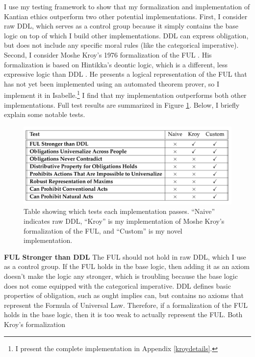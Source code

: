 \begin{isabellebody}
\begin{isamarkuptext}
I use my testing framework to show that my formalization and implementation of Kantian ethics outperform 
two other potential implementations. First, I consider raw DDL, which serves as a control group because it simply contains the base logic
on top of which I build other implementations. DDL can express obligation, but does not include any 
specific moral rules (like the categorical imperative). Second, I consider Moshe Kroy's 1976 formalization 
of the FUL \citep{kroy}. His formalization is based on Hintikka's deontic logic, which is a different,
less expressive logic than DDL \citep{hintikka}. He presents a logical representation of the FUL that has not yet been implemented
using an automated theorem prover, so I implement it in Isabelle.\footnote{I present the complete implementation in
Appendix \ref{kroydetails}.} I find that my implementation outperforms 
both other implementations. Full test results are summarized in Figure \ref{table}. Below, I briefly 
explain some notable tests.%
\end{isamarkuptext}\isamarkuptrue%
%
\begin{figure}
\centering
\includegraphics[scale=0.165]{goalstable.jpeg}
\caption{Table showing which tests each implementation passes. ``Naive'' indicates raw DDL, 
``Kroy'' is my implementation of Moshe Kroy's formalization of the FUL, and ``Custom'' is my novel implementation.} \label{table}
\end{figure}
%
\begin{isamarkuptext}%
\noindent \textbf{FUL Stronger than DDL} The FUL should not hold in raw DDL, which I use as a control group. 
If the FUL holds in the base logic, then adding it as an axiom doesn't make the logic any stronger, 
which is troubling because the base logic does not come equipped with the categorical imperative. DDL
defines basic properties of obligation, such as ought implies can, but contains no axioms that represent
the Formula of Universal Law. Therefore, if a formalization of the FUL holds in the 
base logic, then it is too weak to actually represent the FUL. Both Kroy's formalization

\end{isamarkuptext}
\end{isabellebody}
